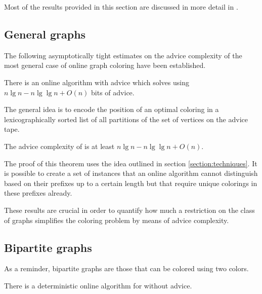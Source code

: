 
Most of the results provided in this section are discussed in more detail
in \cite{misof-trivial-graphs}.

\subsection{General graphs}

The following asymptotically tight estimates on the advice complexity of
the most general case of online graph coloring have been established.

\begin{theorem}\label{theorem:general-graphs-upper}
    There is an online algorithm with advice which solves
     using $n \lg n - n \lg\lg n + O(n)$ bits of
    advice.
\end{theorem}

The general idea is to encode the position of an optimal coloring in a
lexicographically sorted list of all partitions of the set of vertices on
the advice tape.

\begin{theorem}\label{theorem:general-graphs-lower}
    The advice complexity of  is at least $n \lg n - n
    \lg\lg n + O(n)$.
\end{theorem}

The proof of this theorem uses the idea outlined in section
\ref{section:techniques}. It is possible to create a set of instances that
an online algorithm cannot distinguish based on their prefixes up to a
certain length but that require unique colorings in these prefixes
already.

These results are crucial in order to quantify how much a restriction on
the class of graphs simplifies the coloring problem by means of advice
complexity.

\subsection{Bipartite graphs}

As a reminder, bipartite graphs are those that can be colored using two
colors.


\begin{theorem}\label{theorem:bipartite-connected}
    There is a deterministic online algorithm for
     without advice.
\end{theorem}

